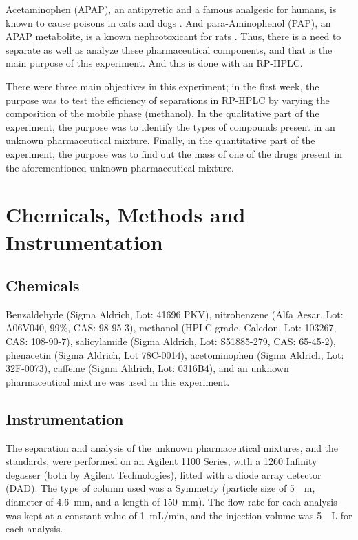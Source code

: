\documentclass[a4paper, 12pt]{article}
\begin{document}
Acetaminophen (APAP), an antipyretic and a famous analgesic for humans, is known to cause poisons in cats and dogs \cite{dogs-cats}. And para-Aminophenol (PAP), an APAP metabolite, is a known nephrotoxicant for rats \cite{rats}. Thus, there is a need to separate as well as analyze these pharmaceutical components, and that is the main purpose of this experiment. And this is done with an RP-HPLC.

There were three main objectives in this experiment; in the first week, the purpose was to test the efficiency of separations in RP-HPLC by varying the composition of the mobile phase (methanol). In the qualitative part of the experiment, the purpose was to identify the types of compounds present in an unknown pharmaceutical mixture. Finally, in the quantitative part of the experiment, the purpose was to find out the mass of one of the drugs present in the aforementioned unknown pharmaceutical mixture.


\section{Chemicals, Methods and Instrumentation}

\subsection{Chemicals}
Benzaldehyde (Sigma Aldrich, Lot: 41696 PKV), nitrobenzene (Alfa Aesar, Lot: A06V040, 99\%, CAS: 98-95-3), methanol (HPLC grade, Caledon, Lot: 103267, CAS: 108-90-7), salicylamide (Sigma Aldrich, Lot: S51885-279, CAS: 65-45-2), phenacetin (Sigma Aldrich, Lot 78C-0014), acetominophen (Sigma Aldrich, Lot: 32F-0073), caffeine (Sigma Aldrich, Lot: 0316B4), and an unknown pharmaceutical mixture was used in this experiment.

\subsection{Instrumentation}
The separation and analysis of the unknown pharmaceutical mixtures, and the standards, were performed on an Agilent 1100 Series, with a 1260 Infinity degasser (both by Agilent Technologies), fitted with a diode array detector (DAD). The type of column used was a Symmetry\textregistered{}  (particle size of \SI{5}{\mu{}m}, diameter of \SI{4.6}{mm}, and a length of \SI{150}{mm}). The flow rate for each analysis was kept at a constant value of \SI{1}{mL/min}, and the injection volume was \SI{5}{\mu{}L} for each analysis.
\end{document}
